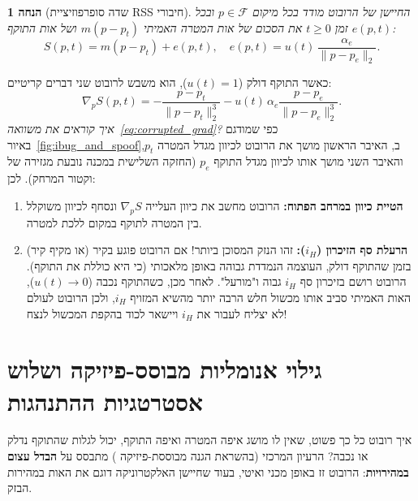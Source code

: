 \documentclass[11pt, a4paper]{article}
\newtheorem{assumption}{הנחה}
\begin{document}
\begin{assumption}[שדה סופרפוזיציית \foreignlanguage{english}{RSS} חיבורי]
\label{assump:superposition}
החיישן של הרובוט מודד בכל מיקום $p \in \mathcal{F}$ ובכל זמן $t \ge 0$ את הסכום של אות המטרה האמיתי $m(p - p_t)$ ושל אות התוקף $e(p, t)$:
\begin{equation}
    S(p, t) = m(p - p_t) + e(p, t), \quad e(p, t) = u(t)\,\frac{\alpha_e}{\|p - p_e\|_2}.
    \label{eq:superposition}
\end{equation}
\end{assumption}

כאשר התוקף דולק ($u(t) = 1$), הוא משבש לרובוט שני דברים קריטיים:
\begin{equation}
    \nabla_p S(p, t) = -\frac{p - p_t}{\|p - p_t\|_2^3} - u(t)\,\alpha_e \frac{p - p_e}{\|p - p_e\|_2^3}.
    \label{eq:corrupted_grad}
\end{equation}
\textit{איך קוראים את משוואה~\eqref{eq:corrupted_grad}?} כפי שמודגם באיור~\ref{fig:ibug_and_spoof}ב, האיבר הראשון מושך את הרובוט לכיוון מגדל המטרה $p_t$, והאיבר השני מושך אותו לכיוון מגדל התוקף $p_e$ (החזקה השלישית במכנה נובעת מגזירה של וקטור המרחק). לכן:
\begin{enumerate}
    \item \textbf{הטיית כיוון במרחב הפתוח:} הרובוט מחשב את כיוון העלייה $\nabla_p S$ ונסחף לכיוון משוקלל בין המטרה לתוקף במקום ללכת למטרה.
    \item \textbf{הרעלת סף הזיכרון ($i_H$):} זהו הנזק המסוכן ביותר! אם הרובוט פוגע בקיר (או מקיף קיר) בזמן שהתוקף דולק, העוצמה הנמדדת גבוהה באופן מלאכותי (כי היא כוללת את התוקף). הרובוט רושם בזיכרון סף $i_H$ גבוה ו"מורעל". לאחר מכן, כשהתוקף נכבה ($u(t) \to 0$), האות האמיתי סביב אותו מכשול חלש הרבה יותר מהשיא המזויף $i_H$, ולכן הרובוט לעולם לא יצליח לעבור את $i_H$ ויישאר לכוד בהקפת המכשול לנצח!
\end{enumerate}

\section{גילוי אנומליות מבוסס-פיזיקה ושלוש אסטרטגיות ההתנהגות}

איך רובוט כל כך פשוט, שאין לו מושג איפה המטרה ואיפה התוקף, יכול לגלות שהתוקף נדלק או נכבה? הרעיון המרכזי (בהשראת הגנה מבוססת-פיזיקה \cite{giraldo2018survey, basseville1993detection}) מתבסס על \textbf{הבדל עצום במהירויות}: הרובוט זז באופן מכני ואיטי, בעוד שחיישן האלקטרוניקה דוגם את האות במהירות הבזק.
\end{document}
